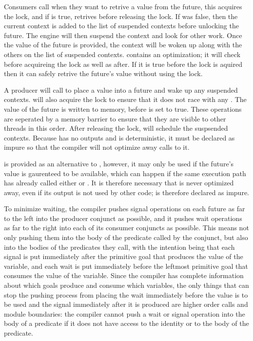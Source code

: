 Consumers call \wait when they want to retrive a value from the future,
this acquires the lock, and if  is true, retrives
 before releasing the lock.
If  was false, then the current context is added to
the list of suspended contexts before unlocking the future.
The engine will then suspend the context and look for other work.
Once the value of the future is provided,
the context will be woken up along with the others on the list of suspended contexts.
\wait contains an optimization; it will check  before
acquireing the lock as well as after.
If it is true before the lock is aquired then it can safely retrive the
future's value without using the lock.

A producer will call \signal to place a value into a future and wake up any
suspended contexts.
\signal will also acquire the lock to ensure that it does not race with any \wait.
The value of the future is written to memory,
before 
 is set to true.
These operations are seperated by a memory barrier to ensure that they are
visible to other threads in this order.
After releasing the lock, \signal will schedule the suspsended contexts.
Because \signal has no outputs and is deterministic,
it must be declared as impure so that the compiler will not optimize away calls
to it.

\get is provided as an alternative to \wait,
however, it may only be used if the future's value is gaurenteed to be
available, which can happen if the same execution path has already called
either \signal or \wait.
It is therefore necessary that \wait is never optimized away, even if its
output is not used by other code;
\wait is therefore declared as impure.

To minimize waiting,
the compiler pushes signal operations on each future
as far to the left into the producer conjunct as possible,
and it pushes wait operations
as far to the right into each of its consumer conjuncts as possible.
This means not only pushing them
into the body of the predicate called by the conjunct,
but also into the bodies of the predicates they call,
with the intention being that
each signal is put immediately after
the primitive goal that produces the value of the variable,
and each wait is put immediately before
the leftmost primitive goal that consumes the value of the variable.
Since the compiler has complete information
about which goals produce and consume which variables,
the only things that can stop the pushing process from placing the
wait immediately before the value is to be used and the signal
immediately after it is produced are
higher order calls and module boundaries:
the compiler cannot push a wait or signal operation
into the body of a predicate
if it does not have access to the identity or to the body of the predicate.


